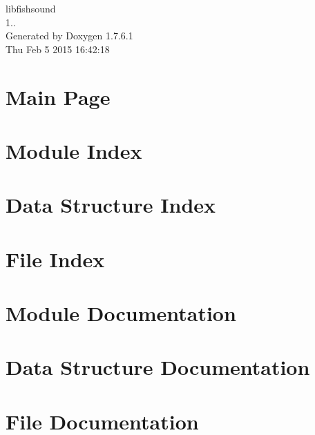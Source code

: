 \documentclass[a4paper]{book}
\begin{document}
\begin{titlepage}
\vspace*{7cm}
\begin{center}
{\Large libfishsound \\[1ex]\large 1.. }\\
\vspace*{1cm}
{\large \-Generated by Doxygen 1.7.6.1}\\
\vspace*{0.5cm}
{\small Thu Feb 5 2015 16:42:18}\\
\end{center}
\end{titlepage}
\clearemptydoublepage
{}
\tableofcontents
\clearemptydoublepage
{}
\chapter{\-Main \-Page}
\label{index}
\chapter{\-Module \-Index}

\chapter{\-Data \-Structure \-Index}

\chapter{\-File \-Index}

\chapter{\-Module \-Documentation}







\chapter{\-Data \-Structure \-Documentation}





\chapter{\-File \-Documentation}






\printindex
\end{document}
